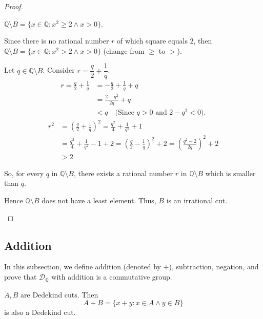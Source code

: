 \begin{proof}
\begin{itemize}[topsep=0pt]
              $\mathbb{Q}\setminus B = \{ x\in\mathbb{Q}: {x}^{2}\ge 2 \wedge x > 0 \}$.

              Since there is no rational number $r$ of which square equals $2$, then $\mathbb{Q}\setminus B = \{ x\in\mathbb{Q}: {x}^{2} > 2 \wedge x > 0 \}$ (change from $\ge$ to $>$).

              Let $q\in\mathbb{Q}\setminus B$. Consider $r = \dfrac{q}{2} + \dfrac{1}{q}$.
              \begin{align*}
                  r = \frac{q}{2} + \frac{1}{q} & = -\frac{q}{2} + \frac{1}{q} + q                       \\
                                                & = \frac{2 - {q}^{2}}{2q} + q                           \\
                                                & < q \quad\text{(Since $q > 0$ and $2 - {q}^{2} < 0$)}.
              \end{align*}
              \begin{align*}
                  {r}^{2} & = {\left(\frac{q}{2} + \frac{1}{q}\right)}^{2} = \frac{q^{2}}{4} + \frac{1}{q^{2}} + 1                                                         \\
                          & = \frac{q^{2}}{4} + \frac{1}{q^{2}} - 1 + 2 = {\left(\frac{q}{2} - \frac{1}{q}\right)}^{2} + 2 = {\left( \frac{q^{2} - 2}{2q} \right)}^{2} + 2 \\
                          & > 2
              \end{align*}

              So, for every $q$ in $\mathbb{Q}\setminus B$, there exists a rational number $r$ in $\mathbb{Q}\setminus B$ which is smaller than $q$.

              Hence $\mathbb{Q}\setminus B$ does not have a least element. Thus, $B$ is an irrational cut.
    \end{itemize}
\end{proof}

\subsection{Addition}

In this subsection, we define addition (denoted by $+$), subtraction, negation, and prove that $\mathscr{D}_{\mathbb{Q}}$ with addition is a commutative group.

\begin{theorem}[Addition]
    $A, B$ are Dedekind cuts. Then
    \[
        A + B = \{ x + y : x\in A \wedge y\in B \}
    \]
    is also a Dedekind cut.
\end{theorem}

